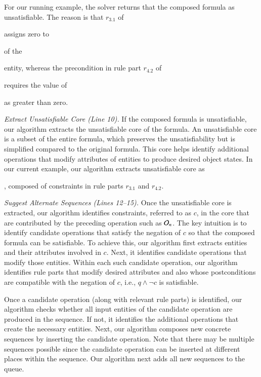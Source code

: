 For our running example, the solver returns that the composed formula
as unsatisfiable. The reason is that $r_{3.1}$ of \subject{CreateOrder} 
assigns zero to \subject{total} of the \subject{Order} entity, whereas the
precondition in rule part $r_{4.2}$ of \subject{GenerateInvoice} requires the value of \subject{total} 
as greater than zero.

\textit{Extract Unsatisfiable Core (Line 10).} If the composed formula is unsatisfiable,
our algorithm extracts the unsatisfiable core of the formula. An unsatisfiable core 
is a subset of the entire formula, which preserves the unsatisfiability but is simplified
compared to the original formula. This core helps identify additional operations that modify attributes of entities
to produce desired object states. In our current example, our algorithm extracts 
unsatisfiable core as \subject{ord.total = 0 $\wedge$ ord.total > 0}, composed of constraints
in rule parts $r_{3.1}$ and $r_{4.2}$. 


\textit{Suggest Alternate Sequences (Lines 12--15).} Once the unsatisfiable core is extracted,
our algorithm identifies constraints, referred to as $c$, in the core that are contributed by the preceding operation
such as ${\cal O}_{n}$. The key intuition is to identify candidate operations
that satisfy the negation of $c$ so that the composed formula can be satisfiable.
To achieve this, our algorithm first extracts entities and their attributes involved
in $c$. Next, it identifies candidate operations that modify those entities.
Within each such candidate operation, our algorithm identifies rule parts 
that modify desired attributes and also whose
postconditions are compatible with the negation of $c$, i.e., $q \wedge \neg c$
is satisfiable.


Once a candidate operation (along with relevant rule parts) is identified, our algorithm
checks whether all input entities of the candidate operation are produced
in the sequence. If not, it identifies the additional operations that create the necessary
entities. Next, our algorithm composes new concrete sequences by inserting the candidate operation.
Note that there may be multiple sequences possible since the candidate operation can be inserted
at different places within the sequence. Our algorithm next adds all new sequences to the queue.

